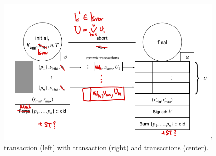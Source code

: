 \begin{figure}[h]

  \centering

  \includegraphics[width=\textwidth/2]{figures/SM_initial_final.png}

  \caption{\mtxInit{} transaction (left) with \mtxAbort{} transaction (right)
    and \mtxCom{} transactions (center).}\label{fig:SM_initial_final}

\end{figure}



